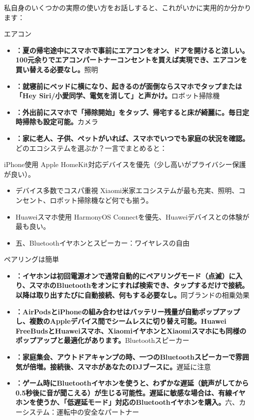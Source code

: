 
私自身のいくつかの実際の使い方をお話しすると、これがいかに実用的か分かります：

エアコン

\begin{itemize}
  \item \textbf{：夏の帰宅途中にスマホで事前にエアコンをオン、ドアを開けると涼しい。100元余りでエアコンパートナーコンセントを買えば実現でき、エアコンを買い替える必要なし。}照明
  \item \textbf{：就寝前にベッドに横になり、起きるのが面倒ならスマホでタップまたは「Hey Siri/小愛同学、電気を消して」と声かけ。}ロボット掃除機
  \item \textbf{：外出前にスマホで「掃除開始」をタップ、帰宅すると床が綺麗に。毎日定時掃除も設定可能。}カメラ
  \item \textbf{：家に老人、子供、ペットがいれば、スマホでいつでも家庭の状況を確認。}どのエコシステムを選ぶか？一言でまとめると：
\end{itemize}

iPhone使用 Apple HomeKit対応デバイスを優先（少し高いがプライバシー保護が良い）。

\begin{itemize}
  \item デバイス多数でコスパ重視 Xiaomi米家エコシステムが最も充実、照明、コンセント、ロボット掃除機など何でも揃う。
  \item Huaweiスマホ使用 HarmonyOS Connectを優先、Huaweiデバイスとの体験が最も良い。
  \item 五、Bluetoothイヤホンとスピーカー：ワイヤレスの自由
\end{itemize}


ペアリングは簡単

\begin{itemize}
  \item \textbf{：イヤホンは初回電源オンで通常自動的にペアリングモード（点滅）に入り、スマホのBluetoothをオンにすれば検索でき、タップするだけで接続。以降は取り出すたびに自動接続、何もする必要なし。}同ブランドの相乗効果
  \item \textbf{：AirPodsとiPhoneの組み合わせはバッテリー残量が自動ポップアップし、複数のAppleデバイス間でシームレスに切り替え可能。Huawei FreeBudsとHuaweiスマホ、XiaomiイヤホンとXiaomiスマホにも同様のポップアップと最適化があります。}Bluetoothスピーカー
  \item \textbf{：家庭集会、アウトドアキャンプの時、一つのBluetoothスピーカーで雰囲気が倍増。接続後、スマホがあなたのDJブースに。}遅延に注意
  \item \textbf{：ゲーム時にBluetoothイヤホンを使うと、わずかな遅延（銃声がしてから0.5秒後に音が聞こえる）が生じる可能性。遅延に敏感な場合は、有線イヤホンを使うか、「低遅延モード」対応のBluetoothイヤホンを購入。}六、カーシステム：運転中の安全なパートナー
\end{itemize}

